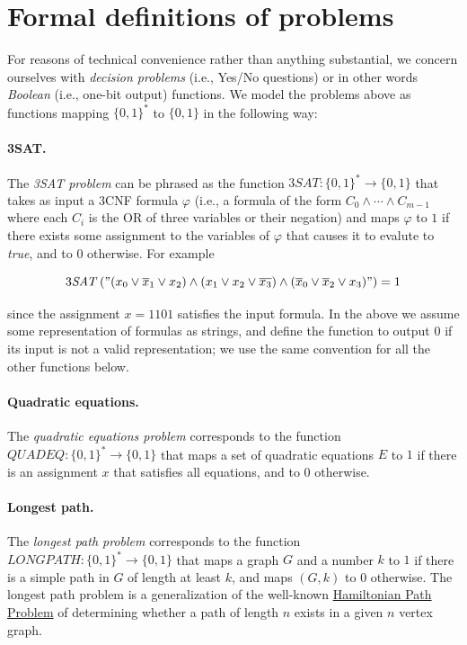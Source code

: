 \section{Formal definitions of
problems}\label{formaldefdecisionexamplessec}

For reasons of technical convenience rather than anything substantial,
we concern ourselves with \emph{decision problems} (i.e., Yes/No
questions) or in other words \emph{Boolean} (i.e., one-bit output)
functions. We model the problems above as functions mapping
\(\{0,1\}^*\) to \(\{0,1\}\) in the following way:

\paragraph{3SAT.} The \emph{3SAT problem} can be phrased as the function
\(3\ensuremath{\mathit{SAT}}:\{0,1\}^* \rightarrow \{0,1\}\) that takes
as input a 3CNF formula \(\varphi\) (i.e., a formula of the form
\(C_0 \wedge \cdots \wedge C_{m-1}\) where each \(C_i\) is the OR of
three variables or their negation) and maps \(\varphi\) to \(1\) if
there exists some assignment to the variables of \(\varphi\) that causes
it to evalute to \emph{true}, and to \(0\) otherwise. For example

\[3\ensuremath{\mathit{SAT}}\left("(x_0 \vee \overline{x}_1 \vee x_2)  \wedge   (x_1 \vee x_2 \vee \overline{x_3}) \wedge (\overline{x}_0 \vee \overline{x}_2 \vee x_3)" \right)  = 1\]

since the assignment \(x = 1101\) satisfies the input formula. In the
above we assume some representation of formulas as strings, and define
the function to output \(0\) if its input is not a valid representation;
we use the same convention for all the other functions below.

\paragraph{Quadratic equations.} The \emph{quadratic equations problem}
corresponds to the function
\(\ensuremath{\mathit{QUADEQ}}:\{0,1\}^* \rightarrow \{0,1\}\) that maps
a set of quadratic equations \(E\) to \(1\) if there is an assignment
\(x\) that satisfies all equations, and to \(0\) otherwise.

\paragraph{Longest path.} The \emph{longest path problem} corresponds to
the function
\(\ensuremath{\mathit{LONGPATH}}:\{0,1\}^* \rightarrow \{0,1\}\) that
maps a graph \(G\) and a number \(k\) to \(1\) if there is a simple path
in \(G\) of length at least \(k\), and maps \((G,k)\) to \(0\)
otherwise. The longest path problem is a generalization of the
well-known
\href{https://en.wikipedia.org/wiki/Hamiltonian_path_problem}{Hamiltonian
Path Problem} of determining whether a path of length \(n\) exists in a
given \(n\) vertex graph.

